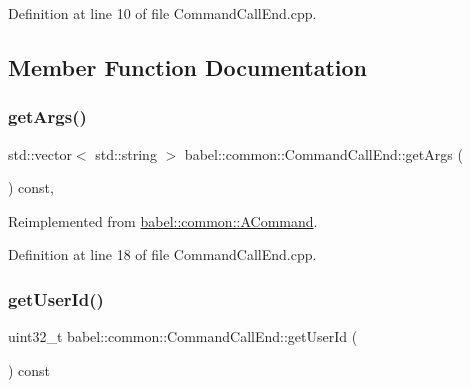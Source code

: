 Definition at line 10 of file Command\+Call\+End.\+cpp.



\subsection{Member Function Documentation}
\mbox{\label{classbabel_1_1common_1_1_command_call_end_a76cf3bf0f091421c71d9e98ca2feb4e0}} 
\subsubsection{\texorpdfstring{get\+Args()}{getArgs()}}
{\footnotesize\ttfamily std\+::vector$<$ std\+::string $>$ babel\+::common\+::\+Command\+Call\+End\+::get\+Args (\begin{DoxyParamCaption}{ }\end{DoxyParamCaption}) const\hspace{0.3cm}{\ttfamily [override]}, {\ttfamily [virtual]}}



Reimplemented from \mbox{\hyperlink{classbabel_1_1common_1_1_a_command_a67b110bc98f6c47b0739c6eba9a5432e}{babel\+::common\+::\+A\+Command}}.



Definition at line 18 of file Command\+Call\+End.\+cpp.

\mbox{\label{classbabel_1_1common_1_1_command_call_end_accce224506da4c186d8450564af2b4ed}} 
\subsubsection{\texorpdfstring{get\+User\+Id()}{getUserId()}}
{\footnotesize\ttfamily uint32\+\_\+t babel\+::common\+::\+Command\+Call\+End\+::get\+User\+Id (\begin{DoxyParamCaption}{ }\end{DoxyParamCaption}) const}



